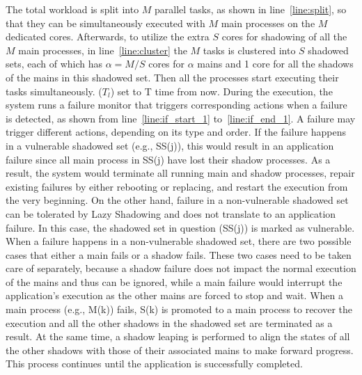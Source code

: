 The total workload is split into $M$ parallel tasks, as shown in line~\ref{line:split}, so that they can be simultaneously executed with $M$
main processes on the $M$ dedicated cores. Afterwards, to utilize the extra $S$ cores for shadowing of 
all the $M$ main processes, in line~\ref{line:cluster} the $M$ tasks is clustered into $S$ shadowed sets, each of which 
has $\alpha=M/S$ cores for $\alpha$ mains and 1 core for all the shadows of the mains in this shadowed set. Then 
all the processes start executing their tasks simultaneously. %
($T_l$) set to T time from now. %
During the execution,
the system runs a failure monitor that triggers corresponding actions when a failure is detected, as shown from line~\ref{line:if_start_1} to~\ref{line:if_end_1}. A failure may trigger different actions, depending on its type and order. 
If the failure happens in a vulnerable shadowed set (e.g., SS(j)), this would result in an application failure since 
all main process in SS(j) have lost their shadow processes. As a result, the system would terminate all running 
main and shadow processes, repair existing failures by either rebooting or replacing, and restart the 
execution from the very beginning. %
On the other hand, failure in a non-vulnerable shadowed set
can be tolerated by Lazy Shadowing and does not translate to an application failure. In this case, 
the shadowed set in question (SS(j)) is marked as vulnerable. When a failure happens in a non-vulnerable shadowed set, there are two possible cases that either 
a main fails or a shadow fails. These two cases need to be taken care of separately, because a shadow 
failure does not impact the normal execution of the mains and thus can be ignored, while a main failure
would interrupt the application's execution as the other mains are forced to stop and wait. When a main process (e.g., M(k)) fails, S(k) is promoted to a main process to recover the execution and all the other shadows in the shadowed set are terminated as a result.
At the same time, a shadow leaping is performed to align the states of all the other shadows with those of their associated mains to make forward progress. %
This process continues until the application is successfully completed.







